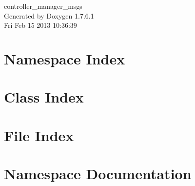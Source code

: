 \documentclass[a4paper]{book}
\begin{document}
\begin{titlepage}
\vspace*{7cm}
\begin{center}
{\Large controller\-\_\-manager\-\_\-msgs }\\
\vspace*{1cm}
{\large \-Generated by Doxygen 1.7.6.1}\\
\vspace*{0.5cm}
{\small Fri Feb 15 2013 10:36:39}\\
\end{center}
\end{titlepage}
\clearemptydoublepage
{}
\tableofcontents
\clearemptydoublepage
{}
\chapter{\-Namespace \-Index}

\chapter{\-Class \-Index}

\chapter{\-File \-Index}

\chapter{\-Namespace \-Documentation}

















\end{document}
